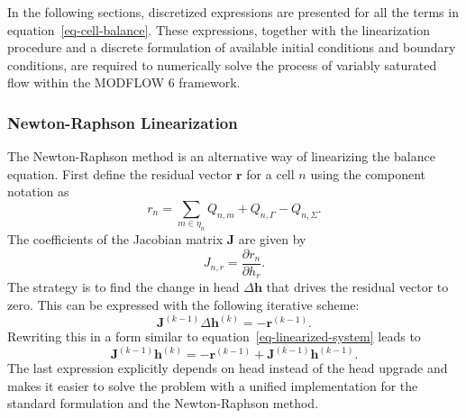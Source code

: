\documentclass[fleqn]{article}
\begin{document}
In the following sections, discretized expressions are presented for
all the terms in equation~\ref{eq-cell-balance}. These expressions,
together with the linearization procedure and a discrete
formulation of available initial conditions and boundary conditions, 
are required to numerically solve the process of variably saturated 
flow within the MODFLOW 6 framework.

\subsubsection*{Newton-Raphson Linearization}
The Newton-Raphson method is an alternative way of linearizing the
balance equation. First define the residual vector $\mathbf{r}$
for a cell $n$ using the component notation as
\begin{equation}
  r_n = \sum_{m \in \eta_n} Q_{n,m} + 
        Q_{n, \Gamma} - 
        Q_{n,\Sigma}.
  \label{eq-residual-cell}
\end{equation}
The coefficients of the Jacobian matrix $\mathbf{J}$ are given by
\begin{equation}
  J_{n,r} = \frac{\partial r_n}{\partial h_r}.
  \label{eq-jacobian}
\end{equation}
The strategy is to find the change in head $\Delta\mathbf{h}$ that
drives the residual vector to zero. This can be expressed with the
following iterative scheme:
\begin{equation}
  \mathbf{J}^{(k-1)} \Delta \mathbf{h}^{(k)} = -\mathbf{r}^{(k-1)}.
\end{equation}
Rewriting this in a form similar to equation~\ref{eq-linearized-system}
leads to
\begin{equation}
  \mathbf{J}^{(k-1)} \mathbf{h}^{(k)} = 
  -\mathbf{r}^{(k-1)} + \mathbf{J}^{(k-1)} \mathbf{h}^{(k-1)}.
  \label{eq-newton-head}
\end{equation}
The last expression explicitly depends on head instead of the
head upgrade and makes it easier to solve the problem with a
unified implementation for the standard formulation and the
Newton-Raphson method.
\end{document}
